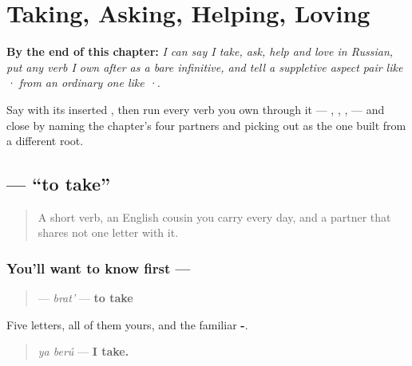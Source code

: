
\chapter{Taking, Asking, Helping, Loving}
\label{ch:russian-verbs-of-the-hand}

\begin{chapteropening}
\textbf{By the end of this chapter:} \emph{I can say I take, ask, help and love in Russian, put any verb I own after  as a bare infinitive, and tell a suppletive aspect pair like · from an ordinary one like ·.}

Say   with its inserted , then run every verb you own through it —   , , ,  — and close by naming the chapter's four partners and picking out  as the one built from a different root.
\end{chapteropening}

\section[\texorpdfstring{\ru{брать} (brat')}{брать (brat')}]{ — \textquotedblleft{}to take\textquotedblright{}}

\label{lesson:RU-C05-brat}



\begin{quote}
A short verb, an English cousin you carry every day, and a partner that shares not one letter with it.
\end{quote}

\subsection*{You'll want to know first — }
\begin{quote}
\textbf{} — \emph{brat'} — \textbf{to take}
\end{quote}

Five letters, all of them yours, and the familiar \textbf{-}.

\begin{quote}
\emph{ya berú} — \textbf{I take.}
\end{quote}

